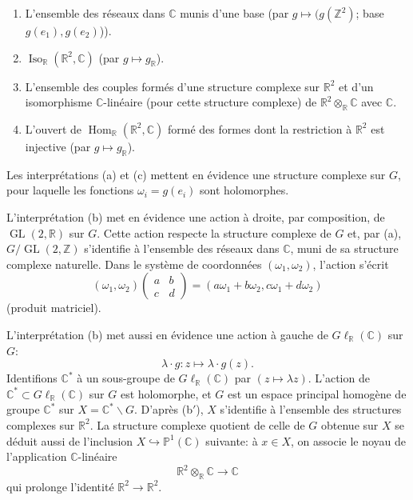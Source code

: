 \documentclass[11pt,a4paper]{amsart}
\theoremstyle{plain}
\theoremstyle{definition}
\theoremstyle{remark}
\DeclareMathOperator{\Hom}{Hom}
\DeclareMathOperator{\GL}{GL}
\DeclareMathOperator{\Iso}{Iso}
\newcommand{\ZZ}{\mathbb{Z}}
\newcommand{\RR}{\mathbb{R}}
\newcommand{\CC}{\mathbb{C}}
\newcommand{\bs}{\backslash}
\begin{document}
\begin{enumerate}
\item[(a)] L'ensemble des r\'eseaux dans $\CC$ munis d'une base (par $g \mapsto (g(\ZZ^2)$; base $g(e_1), g(e_2)$)).

\item[(b)] $\Iso_{\RR}(\RR^2, \CC)$ (par $g \mapsto g_{\RR}$).

\item[(b$'$)] L'ensemble des couples form\'es d'une structure complexe sur $\RR^2$ et d'un isomorphisme $\CC$-lin\'eaire (pour cette structure complexe) de $\RR^2 \otimes_{\RR} \CC$ avec $\CC$.

\item[(c)] L'ouvert de $\Hom_{\RR}(\RR^2, \CC)$ form\'e des formes dont la restriction \`a $\RR^2$ est injective (par $g \mapsto g_{\RR}$).
\end{enumerate}

Les interpr\'etations (a) et (c) mettent en \'evidence une structure complexe sur $G$, pour laquelle les fonctions $\omega_i = g(e_i)$ sont holomorphes.

L'interpr\'etation (b) met en \'evidence une action \`a droite, par composition, de $\GL(2,\RR)$ sur $G$. Cette action respecte la structure complexe de $G$ et, par (a), $G/\GL(2,\ZZ)$ s'identifie \`a l'ensemble des r\'eseaux dans $\CC$, muni de sa structure complexe naturelle. Dans le syst\`eme de coordonn\'ees $(\omega_1, \omega_2)$, l'action s'\'ecrit
\[ (\omega_1, \omega_2) \begin{pmatrix} a & b \\ c & d \end{pmatrix} = (a\omega_1 + b\omega_2, c\omega_1 + d\omega_2) \]
(produit matriciel).

L'interpr\'etation (b) met aussi en \'evidence une action \`a gauche de $G\ell_{\RR}(\CC)$ sur $G$:
\[ \lambda \cdot g: z \longmapsto \lambda \cdot g(z). \]
Identifions $\CC^*$ \`a un sous-groupe de $G\ell_{\RR}(\CC)$ par $(z \mapsto \lambda z)$. L'action de $\CC^* \subset G\ell_{\RR}(\CC)$ sur $G$ est holomorphe, et $G$ est un espace principal homog\`ene de groupe $\CC^*$ sur $X = \CC^* \bs G$. D'apr\`es (b$'$), $X$ s'identifie \`a l'ensemble des structures complexes sur $\RR^2$. La structure complexe quotient de celle de $G$ obtenue sur $X$ se d\'eduit aussi de l'inclusion $X \hookrightarrow \mathbb{P}^1(\CC)$ suivante: \`a $x \in X$, on associe le noyau de l'application $\CC$-lin\'eaire
\[ \RR^2 \otimes_{\RR} \CC \longrightarrow \CC \]
qui prolonge l'identit\'e $\RR^2 \to \RR^2$.
\end{document}
